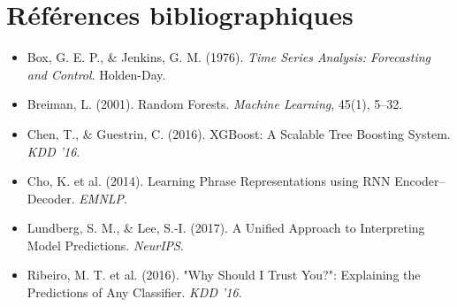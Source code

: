 \documentclass[12pt,a4paper]{article}
\begin{document}
\section*{Références bibliographiques}
\begin{itemize}
    \item Box, G. E. P., \& Jenkins, G. M. (1976). \textit{Time Series Analysis: Forecasting and Control}. Holden-Day.
    \item Breiman, L. (2001). Random Forests. \textit{Machine Learning}, 45(1), 5–32.
    \item Chen, T., \& Guestrin, C. (2016). XGBoost: A Scalable Tree Boosting System. \textit{KDD '16}.
    \item Cho, K. et al. (2014). Learning Phrase Representations using RNN Encoder–Decoder. \textit{EMNLP}.
    \item Lundberg, S. M., \& Lee, S.-I. (2017). A Unified Approach to Interpreting Model Predictions. \textit{NeurIPS}.
    \item Ribeiro, M. T. et al. (2016). "Why Should I Trust You?": Explaining the Predictions of Any Classifier. \textit{KDD '16}.
\end{itemize}
\end{document}
